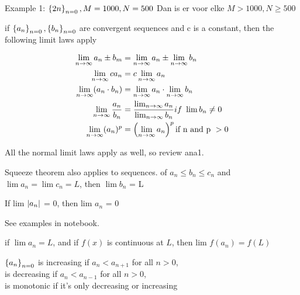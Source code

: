 \documentclass[17pt]{extarticle} %
\begin{document}
Example 1:
$\left\{ 2n \right\}_{n=0}, M=1000, N = 500$
Dan is er voor elke $M > 1000, N \ge 500$



\begin{theorem*}[Th 6]
    if $\left\{ a_n \right\}_{n=0}, \left\{ b_n \right\}_{n=0}$  are convergent sequences and c is a constant, then the following limit laws apply
\end{theorem*}

$$
    \begin{aligned}
        \lim_{n \to \infty} a_n \pm b_m       & =  \lim_{n \to \infty} a_n \pm \lim_{n \to \infty} b_n                          \\
        \lim_{n \to \infty} c a_n             & = c \lim_{n \to \infty} a_n                                                     \\
        \lim_{n \to \infty}  ( a_n \cdot b_n) & = \lim_{n \to \infty}  a_n \cdot \lim_{n \to \infty}  b_n                       \\
        \lim_{n \to \infty}  \frac{a_n}{b_n}  & = {\lim_{n \to \infty}  a_n \over \lim_{n \to \infty } b_n} if\ \lim b_n \neq 0 \\
        \lim_{n \to \infty}  (a_n)^p          & = \left( \lim_{n \to \infty}  a_n \right)^p \text{if n and p } > 0
    \end{aligned}
$$

All the normal limit laws apply as well, so review ana1.

\begin{theorem*}[Squeeze th.]
    Squeeze theorem also applies to sequences. of $a_n \leq b_n \leq c_n$ and $\lim a_n = \lim c_n = L$,
    then $\lim b_n$ = L
\end{theorem*}

\begin{theorem*}[Th 6]
    If lim $\left|a_n\right|$ = 0, then lim $a_n$ = 0
\end{theorem*}

See examples in notebook.

\begin{theorem*}[Th 7]
    if $\lim a_n = L$, and if $f(x)$ is continuous at $L$, then lim $f(a_n) = f(L)$

\end{theorem*}

\begin{theorem*}
    $\left\{ a_n \right\}_{n=0}$ is increasing if $a_n < a_{n+1}$ for all $n > 0$,\\
    is decreasing if $a_n < a_{n-1}$ for all $n > 0$,\\
    is monotonic if it's only decreasing or increasing

\end{theorem*}
\end{document}
